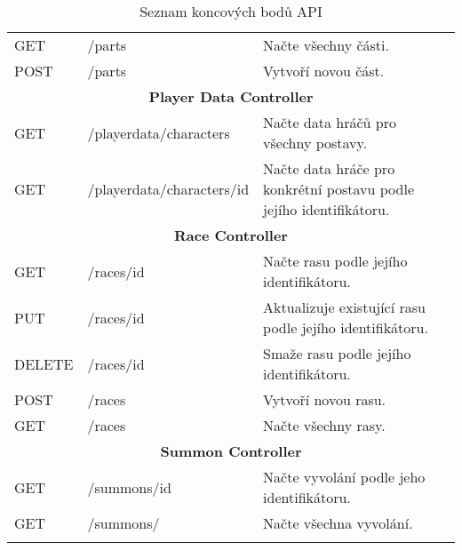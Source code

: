 \begin{longtable}{|l|l|p{}|}
    GET             & /parts                      & Načte všechny části.                                                \\
    POST            & /parts                      & Vytvoří novou část.                                                 \\
    \hline
    \multicolumn{3}{|c|}{\textbf{Player Data Controller}}                                                               \\
    \hline
    GET             & /playerdata/characters      & Načte data hráčů pro všechny postavy.                               \\
    GET             & /playerdata/characters/{id} & Načte data hráče pro konkrétní postavu podle jejího identifikátoru. \\
    \hline
    \multicolumn{3}{|c|}{\textbf{Race Controller}}                                                                      \\
    \hline
    GET             & /races/{id}                 & Načte rasu podle jejího identifikátoru.                             \\
    PUT             & /races/{id}                 & Aktualizuje existující rasu podle jejího identifikátoru.            \\
    DELETE          & /races/{id}                 & Smaže rasu podle jejího identifikátoru.                             \\
    POST            & /races                      & Vytvoří novou rasu.                                                 \\
    GET             & /races                      & Načte všechny rasy.                                                 \\
    \hline
    \multicolumn{3}{|c|}{\textbf{Summon Controller}}                                                                    \\
    \hline
    GET             & /summons/{id}               & Načte vyvolání podle jeho identifikátoru.                           \\
    GET             & /summons/                   & Načte všechna vyvolání.                                             \\
    \hline
    \caption{Seznam koncových bodů API}
    \label{tab:endpoints}
\end{longtable}